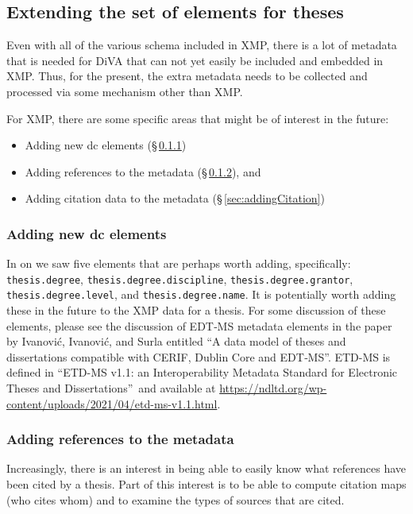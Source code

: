 \subsection{Extending the set of elements for theses}
\label{sec:newMetadataForTheses}
Even with all of the various schema included in XMP, there is a lot of metadata that is needed for DiVA that can not yet easily be included and embedded in XMP. Thus, for the present, the extra metadata needs to be collected and processed via some mechanism other than XMP.

For XMP, there are some specific areas that might be of interest in the future:
\begin{itemize}
  \item Adding new dc elements (§\,\ref{sec:newDCelements}) 
  \item Adding references to the metadata (§\,\ref{sec:addingReferences}), and 
  \item Adding citation data to the metadata (§\,\ref{sec:addingCitation})
\end{itemize}

\subsubsection{Adding new dc elements}
\label{sec:newDCelements}
In  on \pageref{tab:dublicCoreDigitalCommons} we saw five elements that are perhaps worth adding, specifically:
\texttt{thesis.degree}, \texttt{thesis.degree.discipline}, \linebreak[4]\texttt{thesis.degree.grantor}, \texttt{thesis.degree.level}, and \linebreak[4] \texttt{thesis.degree.name}. It is potentially worth adding these in the future to the XMP data for a thesis. For some discussion of these elements, please see the discussion of EDT‐MS metadata elements in the paper by Ivanović, Ivanović, and Surla entitled ``A data model of theses and dissertations compatible with {CERIF}, {Dublin} {Core} and {EDT}‐{MS}''\cite{ivanovic_data_2012}. ETD-MS is defined in ``ETD-MS v1.1: an Interoperability Metadata Standard for Electronic Theses and Dissertations''\,\cite{hickey_pavani_suleman_2010} and available at \url{https://ndltd.org/wp-content/uploads/2021/04/etd-ms-v1.1.html}.


\subsubsection{Adding references to the metadata}
\label{sec:addingReferences}
Increasingly, there is an interest in being able to easily know what references have been cited by a thesis. Part of this interest is to be able to compute citation maps (who cites whom) and to examine the types of sources that are cited.

